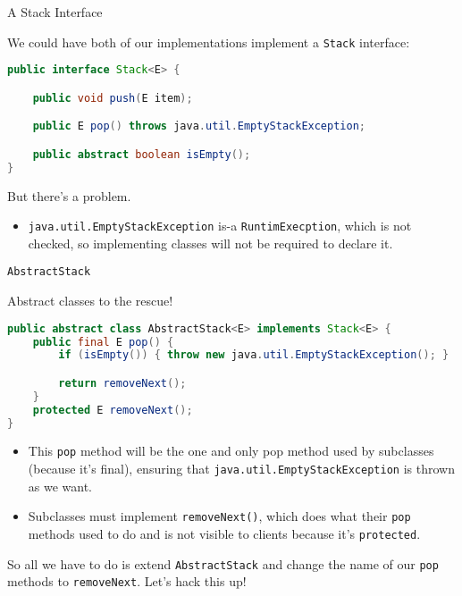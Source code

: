 \documentclass{beamer}
\begin{document}
\begin{frame}[fragile]{A Stack Interface}


We could have both of our implementations implement a {\tt Stack} interface:
\begin{lstlisting}[language=Java]
public interface Stack<E> {

    public void push(E item);

    public E pop() throws java.util.EmptyStackException;

    public abstract boolean isEmpty();
}
\end{lstlisting}
But there's a problem.
\begin{itemize}
\item {\tt java.util.EmptyStackException} is-a {\tt RuntimExecption}, which is not checked, so implementing classes will not be required to declare it.
\end{itemize}


\end{frame}

\begin{frame}[fragile]{{\tt AbstractStack}}


Abstract classes to the rescue!
\begin{lstlisting}[language=Java]
public abstract class AbstractStack<E> implements Stack<E> {
    public final E pop() {
        if (isEmpty()) { throw new java.util.EmptyStackException(); }

        return removeNext();
    }
    protected E removeNext();
}
\end{lstlisting}

\begin{itemize}
\item This {\tt pop} method will be the one and only pop method used by subclasses (because it's final), ensuring that {\tt java.util.EmptyStackException} is thrown as we want.
\item Subclasses must implement {\tt removeNext()}, which does what their {\tt pop} methods used to do and is not visible to clients because it's {\tt protected}. 
\end{itemize}

So all we have to do is extend {\tt AbstractStack} and change the name of our {\tt pop} methods to {\tt removeNext}.  Let's hack this up!

\end{frame}
\end{document}
